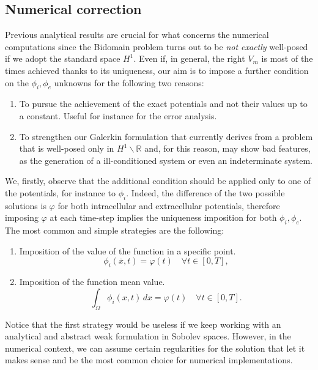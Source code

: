 \documentclass[a4paper,11pt]{article}
\begin{document}
\subsection{Numerical correction} \label{imposition_section}
Previous analytical results are crucial for what concerns the numerical computations since the Bidomain problem turns out to be \emph{not exactly} well-posed if we adopt the standard space $H^1$. Even if, in general, the right $V_m$ is most of the times achieved thanks to its uniqueness, our aim is to impose a further condition on the $\phi_i,\phi_e$ unknowns for the following two reasons:
\begin{enumerate}
	\item To pursue the achievement of the exact potentials and not their values up to a constant. Useful for instance for the error analysis.
	\item To strengthen our Galerkin formulation that currently derives from a problem that is well-posed only in $H^1\backslash \mathbb{R}$ and, for this reason, may show bad features, as the generation of a ill-conditioned system or even an indeterminate system.
\end{enumerate}

\vspace{3mm}
\noindent We, firstly, observe that the additional condition should be applied only to one of the potentials, for instance to $\phi_i$. Indeed, the difference of the two possible solutions is $\varphi$ for both intracellular and extracellular potentials, therefore imposing $\varphi$ at each time-step implies the uniqueness imposition for both $\phi_i,\phi_e$. \\

\noindent The most common and simple strategies are the following:
\begin{enumerate}
	\item Imposition of the value of the function in a specific point.
	\begin{equation*}
	\phi_i(\bar{x},t) = \varphi(t) \quad \forall t \in [0,T],
	\end{equation*}
	\item Imposition of the function mean value.
	\begin{equation*}
	\int_\Omega \phi_i(x,t)\,dx = \varphi(t) \quad \forall t \in [0,T].
	\end{equation*}
\end{enumerate}

\noindent Notice that the first strategy would be useless if we keep working with an analytical and abstract weak formulation in Sobolev spaces. However, in the numerical context, we can assume certain regularities for the solution that let it makes sense and be the most common choice for numerical implementations. \\
\end{document}
